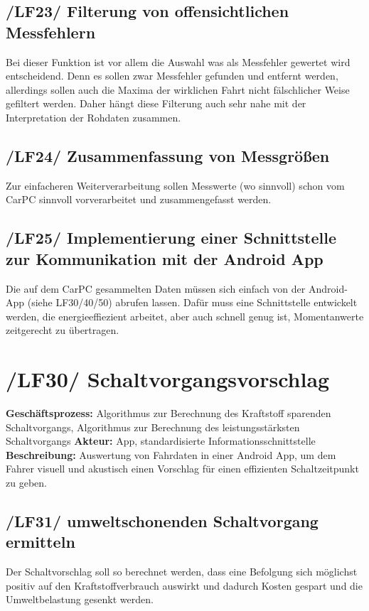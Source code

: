 \subsection{/LF23/ Filterung von offensichtlichen Messfehlern}
Bei dieser Funktion ist vor allem die Auswahl was als Messfehler gewertet wird entscheidend. Denn es sollen zwar Messfehler gefunden und entfernt werden, allerdings sollen auch die Maxima der wirklichen Fahrt nicht fälschlicher Weise gefiltert werden. Daher hängt diese Filterung auch sehr nahe mit der Interpretation der Rohdaten zusammen.

\subsection{/LF24/ Zusammenfassung von Messgrößen}
Zur einfacheren Weiterverarbeitung sollen Messwerte (wo sinnvoll) schon vom CarPC sinnvoll vorverarbeitet und zusammengefasst werden.

\subsection{/LF25/ Implementierung einer Schnittstelle zur Kommunikation mit der Android App}
Die auf dem CarPC gesammelten Daten müssen sich einfach von der Android-App (siehe LF30/40/50) abrufen lassen. Dafür muss eine Schnittstelle entwickelt werden, die energieeffiezient arbeitet, aber auch schnell genug ist, Momentanwerte zeitgerecht zu übertragen.

\newpage

\section{/LF30/ Schaltvorgangsvorschlag}
\textbf{Geschäftsprozess:}	Algorithmus zur Berechnung des Kraftstoff sparenden Schaltvorgangs, Algorithmus zur Berechnung des leistungsstärksten Schaltvorgangs
\newline
\textbf{Akteur:}		App, standardisierte Informationsschnittstelle
\newline
\textbf{Beschreibung:} Auswertung von Fahrdaten in einer Android App, um dem Fahrer visuell und akustisch einen Vorschlag für einen effizienten Schaltzeitpunkt zu geben.

\subsection{/LF31/ umweltschonenden Schaltvorgang ermitteln}
\newline
Der Schaltvorschlag soll so berechnet werden, dass eine Befolgung sich möglichst positiv auf den Kraftstoffverbrauch auswirkt und dadurch Kosten gespart und die Umweltbelastung gesenkt werden.

